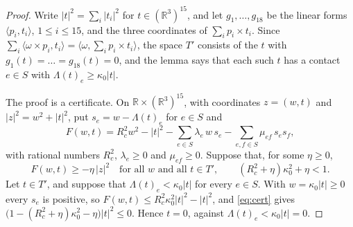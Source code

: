 \documentclass[12pt]{amsart}
\theoremstyle{definition}
\theoremstyle{plain}
\theoremstyle{definition}
\newcommand{\R}{\mathbb{R}}
\begin{document}
\begin{proof}
Write $|t|^2=\sum_i|t_i|^2$ for $t\in(\R^3)^{15}$, and let $g_1,\dots,g_{18}$ be the linear forms $\langle p_i,t_i\rangle$, $1\le i\le15$, and the three coordinates of $\sum_ip_i\times t_i$. Since $\sum_i\langle\omega\times p_i,t_i\rangle=\langle\omega,\sum_ip_i\times t_i\rangle$, the space $T'$ consists of the $t$ with $g_1(t)=\dots=g_{18}(t)=0$, and the lemma says that each such $t$ has a contact $e\in S$ with $\Lambda(t)_e\ge\kappa_0|t|$.

The proof is a certificate. On $\R\times(\R^3)^{15}$, with coordinates $z=(w,t)$ and $|z|^2=w^2+|t|^2$, put $s_e=w-\Lambda(t)_e$ for $e\in S$ and
\[
F(w,t)=R_c^2w^2-|t|^2-\sum_{e\in S}\lambda_e\,w\,s_e-\sum_{e,f\in S}\mu_{ef}\,s_es_f ,
\]
with rational numbers $R_c^2$, $\lambda_e\ge0$ and $\mu_{ef}\ge0$. Suppose that, for some $\eta\ge0$,
\begin{equation}\label{eq:cert}
F(w,t)\ge-\eta\,|z|^2\quad\text{for all $w$ and all $t\in T'$},\qquad (R_c^2+\eta)\kappa_0^2+\eta<1 .
\end{equation}
Let $t\in T'$, and suppose that $\Lambda(t)_e<\kappa_0|t|$ for every $e\in S$. With $w=\kappa_0|t|\ge0$ every $s_e$ is positive, so $F(w,t)\le R_c^2\kappa_0^2|t|^2-|t|^2$, and \eqref{eq:cert} gives $\bigl(1-(R_c^2+\eta)\kappa_0^2-\eta\bigr)|t|^2\le0$. Hence $t=0$, against $\Lambda(t)_e<\kappa_0|t|=0$.


\end{proof}
\end{document}
